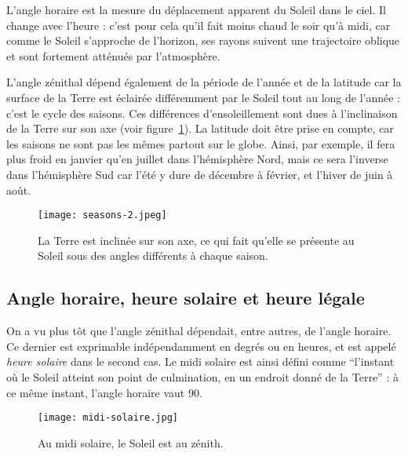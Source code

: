 \documentclass[12pt]{article}
\begin{document}
L'angle horaire est la mesure du déplacement apparent du Soleil dans le ciel. 
Il change avec l'heure : c'est pour cela qu'il fait moins chaud le soir qu'à midi, car comme le Soleil s'approche de l'horizon, ses rayons suivent une trajectoire oblique et sont fortement atténués par l'atmosphère.

L'angle zénithal dépend également de la période de l'année et de la latitude car la surface de la Terre est éclairée différemment par le Soleil tout au long de l'année : c'est le cycle des saisons.
Ces différences d'ensoleillement sont dues à l'inclinaison de la Terre sur son axe (voir figure~\ref{fig:seasons-year}).
La latitude doit être prise en compte, car les saisons ne sont pas les mêmes partout sur le globe.
Ainsi, par exemple, il fera plus froid en janvier qu'en juillet dans l'hémisphère Nord, mais ce sera l'inverse dans l'hémisphère Sud car l'été y dure de décembre à février, et l'hiver de juin à août.

 \begin{figure}[H]
	\centerline{\texttt{[image: seasons-2.jpeg]}}
	\caption{La Terre est inclinée sur son axe, ce qui fait qu'elle se présente au Soleil sous des angles différents à chaque saison.}
	\label{fig:seasons-year}
\end{figure}
	

\subsection{Angle horaire, heure solaire et heure légale}

On a vu plus tôt que l'angle zénithal dépendait, entre autres, de l'angle horaire.
Ce dernier est exprimable indépendamment en degrés ou en heures, et est appelé \emph{heure solaire} dans le second cas.
Le midi solaire est ainsi défini comme ``l'instant où le Soleil atteint son point de culmination, en un endroit donné de la Terre''\cite{temps_solaire_wiki} : à ce même instant, l'angle horaire vaut 90\degree.

 \begin{figure}[H]
	\centerline{\texttt{[image: midi-solaire.jpg]}}
	\caption{Au midi solaire, le Soleil est au zénith.}
	\label{fig:solar-noon}
\end{figure}
\end{document}
